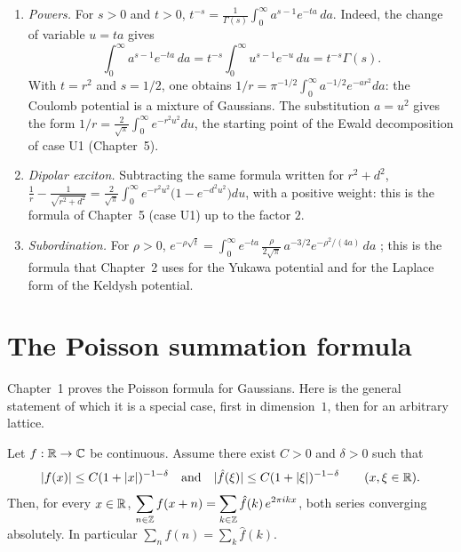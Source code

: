 \begin{example}\label{appA:ex:laplace}
\begin{enumerate}
\item \emph{Powers.} For $s>0$ and $t>0$, $t^{-s}=\frac1{\Gamma(s)}\int_0^\infty a^{s-1}e^{-ta}\,da$. Indeed, the
change of variable $u=ta$ gives
\[\int_0^\infty a^{s-1}e^{-ta}\,da=t^{-s}\int_0^\infty u^{s-1}e^{-u}\,du=t^{-s}\Gamma(s).\]
With $t=r^2$ and $s=1/2$, one obtains $1/r=\pi^{-1/2}\int_0^\infty a^{-1/2}e^{-ar^2}da$: the Coulomb potential is
a mixture of Gaussians. The substitution $a=u^2$ gives the form $1/r=\frac2{\sqrt\pi}\int_0^\infty e^{-r^2u^2}du$,
the starting point of the Ewald decomposition of case U1 (Chapter~5).
\item \emph{Dipolar exciton.} Subtracting the same formula written for $r^2+d^2$,
$\frac1r-\frac1{\sqrt{r^2+d^2}}=\frac2{\sqrt\pi}\int_0^\infty e^{-r^2u^2}\bigl(1-e^{-d^2u^2}\bigr)du$, with a
positive weight: this is the formula of Chapter~5 (case U1) up to the factor $2$.
\item \emph{Subordination.} For $\rho>0$, $e^{-\rho\sqrt t}=\int_0^\infty e^{-ta}\,\frac{\rho}{2\sqrt\pi}\,a^{-3/2}
e^{-\rho^2/(4a)}\,da$ \tierL{}; this is the formula that Chapter~2 uses for the Yukawa potential and for the
Laplace form of the Keldysh potential.
\end{enumerate}
\end{example}

\section{The Poisson summation formula}\label{appA:sec:poisson}

Chapter~1 proves the Poisson formula for Gaussians. Here is the general statement of which it is a special case,
first in dimension~$1$, then for an arbitrary lattice.

\begin{theorem}\label{appA:thm:poisson1}
Let $f:\mathbb{R}\to\mathbb{C}$ be continuous. Assume there exist $C>0$ and $\delta>0$ such that
\[|f(x)|\le C(1+|x|)^{-1-\delta}\quad\text{and}\quad|\hat f(\xi)|\le C(1+|\xi|)^{-1-\delta}\qquad(x,\xi\in\mathbb{R}).\]
Then, for every $x\in\mathbb{R}$, $\displaystyle\sum_{n\in\mathbb{Z}}f(x+n)=\sum_{k\in\mathbb{Z}}\hat f(k)\,e^{2\pi ikx}$, both series
converging absolutely. In particular $\sum_nf(n)=\sum_k\hat f(k)$.
\end{theorem}

